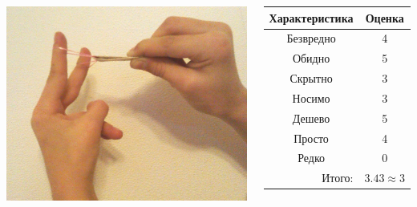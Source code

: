 \begin{frame} %
    \begin{columns}
            \begin{center}
                \includegraphics[width=\textwidth]{fig/slingshot}
            \end{center}
            
            \begin{center}
                \begin{tabular}{c|c}
                    \hline\hline
                    Характеристика              & Оценка\\ \hline\hline
                    Безвредно                   & 4 \\
                    Обидно                      & 5 \\
                    Скрытно                     & 3 \\
                    Носимо                      & 3 \\
                    Дешево                      & 5 \\
                    Просто                      & 4 \\ 
                    Редко                       & 0 \\ \hline
                    \multicolumn{1}{r|}{Итого:} & $3.43\approx 3$ \\
                \end{tabular}
            \end{center}
    \end{columns}    
\end{frame}


